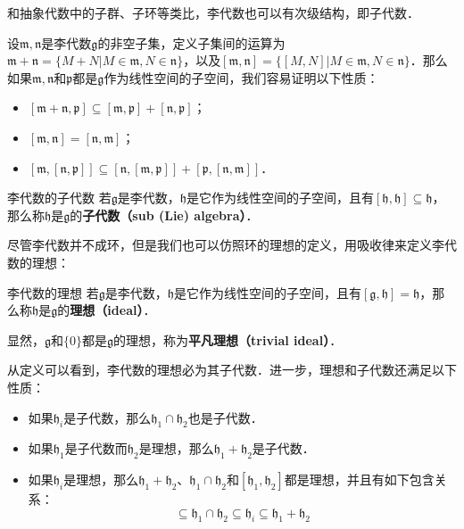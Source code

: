 



和抽象代数中的子群、子环等类比，李代数也可以有次级结构，即子代数．

设$\mathfrak{m}, \mathfrak{n}$是李代数$\mathfrak{g}$的非空子集，定义子集间的运算为$\mathfrak{m}+\mathfrak{n}=\{M+N|M\in\mathfrak{m}, N\in\mathfrak{n}\}$，以及$[\mathfrak{m}, \mathfrak{n}]=\{[M, N]|M\in\mathfrak{m}, N\in\mathfrak{n}\}$．那么如果$\mathfrak{m}, \mathfrak{n}$和$\mathfrak{p}$都是$\mathfrak{g}$作为线性空间的子空间，我们容易证明以下性质：

\begin{itemize}
\item $[\mathfrak{m}+\mathfrak{n}, \mathfrak{p}]\subseteq[\mathfrak{m}, \mathfrak{p}]+[\mathfrak{n}, \mathfrak{p}]$；
\item $[\mathfrak{m},\mathfrak{n}]=[\mathfrak{n}, \mathfrak{m}]$；
\item $[\mathfrak{m}, [\mathfrak{n}, \mathfrak{p}]]\subseteq[\mathfrak{n}, [\mathfrak{m}, \mathfrak{p}]]+[\mathfrak{p}, [\mathfrak{n}, \mathfrak{m}]]$．
\end{itemize}

\begin{definition}{李代数的子代数}
若$\mathfrak{g}$是李代数，$\mathfrak{h}$是它作为线性空间的子空间，且有$[\mathfrak{h}, \mathfrak{h}]\subseteq\mathfrak{h}$，那么称$\mathfrak{h}$是$\mathfrak{g}$的\textbf{子代数（sub (Lie) algebra）}．
\end{definition}


尽管李代数并不成环，但是我们也可以仿照环的理想的定义，用吸收律来定义李代数的理想：

\begin{definition}{李代数的理想}
若$\mathfrak{g}$是李代数，$\mathfrak{h}$是它作为线性空间的子空间，且有$[\mathfrak{g}, \mathfrak{h}]=\mathfrak{h}$，那么称$\mathfrak{h}$是$\mathfrak{g}$的\textbf{理想（ideal）}．

显然，$\mathfrak{g}$和$\{0\}$都是$\mathfrak{g}$的理想，称为\textbf{平凡理想（trivial ideal）}．
\end{definition}

从定义可以看到，李代数的理想必为其子代数．进一步，理想和子代数还满足以下性质：

\begin{itemize}
\item 如果$\mathfrak{h}_i$是子代数，那么$\mathfrak{h}_1\cap\mathfrak{h}_2$也是子代数．
\item 如果$\mathfrak{h}_1$是子代数而$\mathfrak{h}_2$是理想，那么$\mathfrak{h}_1+\mathfrak{h}_2$是子代数．
\item 如果$\mathfrak{h}_i$是理想，那么$\mathfrak{h}_1+\mathfrak{h}_2$、$\mathfrak{h}_1\cap\mathfrak{h}_2$和$[\mathfrak{h}_1, \mathfrak{h}_2]$都是理想，并且有如下包含关系：\begin{equation}
[\mathfrak{h}_1, \mathfrak{h}_2]\subseteq\mathfrak{h}_1\cap\mathfrak{h}_2\subseteq\mathfrak{h}_i\subseteq\mathfrak{h}_1+\mathfrak{h}_2
\end{equation}

\end{itemize}

